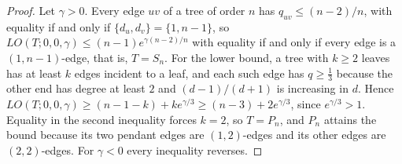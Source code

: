 \documentclass[a5paper, 10pt]{article}
\theoremstyle{plain}
\theoremstyle{remark}
\theoremstyle{definition}
\begin{document}
\begin{proof}
Let $\gamma > 0$. Every edge $uv$ of a tree of order $n$ has
$q_{uv} \le (n-2)/n$, with equality if and only if $\{d_u,d_v\} =
\{1,n-1\}$, so $LO(T;0,0,\gamma) \le (n-1)e^{\gamma(n-2)/n}$ with
equality if and only if every edge is a $(1,n-1)$-edge, that is,
$T = S_n$. For the lower bound, a tree with $k \ge 2$ leaves has at
least $k$ edges incident to a leaf, and each such edge has
$q \ge \tfrac13$ because the other end has degree at least $2$ and
$(d-1)/(d+1)$ is increasing in $d$. Hence
$LO(T;0,0,\gamma) \ge (n-1-k) + k e^{\gamma/3} \ge (n-3) + 2e^{\gamma/3}$,
since $e^{\gamma/3} > 1$. Equality in the second inequality forces
$k = 2$, so $T = P_n$, and $P_n$ attains the bound because its two
pendant edges are $(1,2)$-edges and its other edges are $(2,2)$-edges.
For $\gamma < 0$ every inequality reverses.
\end{proof}
\end{document}
